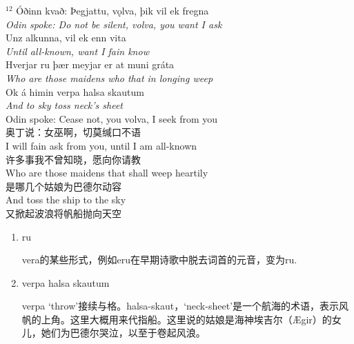 \begin{paracol}{2}
    \noindent
    $^{12}$ Óðinn kvað: Þegjattu, vǫlva, þik vil ek fregna\\
    \textit{Odin spoke: Do not be silent, volva, you want I ask}\\
    Unz alkunna, vil ek enn vita\\
    \textit{Until all-known, want I fain know}\\
    Hverjar ru þær meyjar er at muni gráta\\
    \textit{Who are those maidens who that in longing weep}\\
    Ok á himin verpa halsa skautum\\
    \textit{And to sky toss neck's sheet}\\
    \switchcolumn
    \noindent
    Odin spoke: Cease not, you volva, I seek from you\\
    奥丁说：女巫啊，切莫缄口不语\\
    I will fain ask from you, until I am all-known\\
    许多事我不曾知晓，愿向你请教\\
    Who are those maidens that shall weep heartily\\
    是哪几个姑娘为巴德尔动容\\
    And toss the ship to the sky\\
    又掀起波浪将帆船抛向天空

\end{paracol}
\begin{grammar*}{}
    \begin{enumerate}[leftmargin=*]
        \item ru

              vera的某些形式，例如eru在早期诗歌中脱去词首的元音，变为ru.

        \item verpa halsa skautum

              verpa `throw'接续与格。halsa-skaut，`neck-sheet'是一个航海的术语，表示风帆的上角。这里大概用来代指船。这里说的姑娘是海神埃吉尔（Ægir）的女儿，她们为巴德尔哭泣，以至于卷起风浪。
    \end{enumerate}
\end{grammar*}

